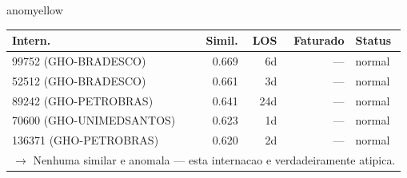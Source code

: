 \documentclass[a4paper,10pt]{article}
\begin{document}
\begin{anomalycard}[Internacao 57846 | GHO-PETROBRAS | MODERADO (z=2.29)]{anomyellow}
\begin{tabular}{l r r r l}\toprule\textbf{Intern.} & \textbf{Simil.} & \textbf{LOS} & \textbf{Faturado} & \textbf{Status} \\\midrule
99752 (GHO-BRADESCO) & 0.669 & 6d & --- & \textcolor{jcubeblue}{normal} \\
52512 (GHO-BRADESCO) & 0.661 & 3d & --- & \textcolor{jcubeblue}{normal} \\
89242 (GHO-PETROBRAS) & 0.641 & 24d & --- & \textcolor{jcubeblue}{normal} \\
70600 (GHO-UNIMEDSANTOS) & 0.623 & 1d & --- & \textcolor{jcubeblue}{normal} \\
136371 (GHO-PETROBRAS) & 0.620 & 2d & --- & \textcolor{jcubeblue}{normal} \\
\multicolumn{5}{l}{\textcolor{jcubeblue}{\small $\rightarrow$ Nenhuma similar e anomala --- esta internacao e verdadeiramente atipica.}} \\
\bottomrule\end{tabular}


\end{anomalycard}

\newpage
\end{document}
